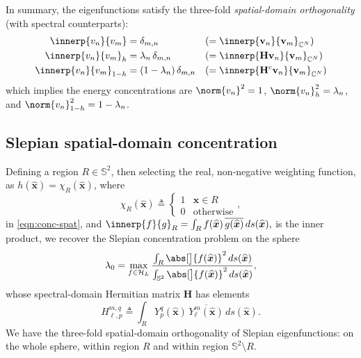 \documentclass[10pt, twocolumn, twoside]{IEEEtran}
\newcommand{\untsph}{\mathbb{S}^{2}} %
\newcommand{\unit}[1]{\widehat{\bm{#1}}}
\newcommand{\cmplx}{\mathbb{C}} %
\newcommand{\dfn}{\triangleq}
\newcommand{\conj}[1]{\overline{#1}} %
\begin{document}
In summary, the eigenfunctions satisfy the three-fold \emph{spatial-domain orthogonality} (with spectral counterparts):
\begin{align*}
	\innerp{v_n}{v_m}&=\delta_{m,n}
		&&(= \innerp{\mathbf{v}_n}{\mathbf{v}_m}_{\cmplx^N})\\
	\innerp{v_n}{v_m}_h&=\lambda_n\,\delta_{m,n}
		&&(=\innerp{\mathbf{H}\mathbf{v}_n}{\mathbf{v}_m}_{\cmplx^N})\\
	\innerp{v_n}{v_m}_{1-h}&=(1-\lambda_n)\,\delta_{m,n}
		&&(=\innerp{\mathbf{H}^{c}\mathbf{v}_n}{\mathbf{v}_m}_{\cmplx^N})
\end{align*}
which implies the energy concentrations are $\norm{v_n}^2=1$, $\norm{v_n}_h^2=\lambda_n$, and $\norm{v_n}_{1-h}^2=1-\lambda_n$.

\subsection{Slepian spatial-domain concentration}

Defining a region $R\in\untsph$, then selecting the real, non-negative weighting function, as $h(\unit{x})=\chi^{}_{R}(\unit{x})$, where
\begin{equation}
\label{eqn:indicator}
	\chi^{}_{R}(\unit{x}) \dfn
	\begin{cases}
		1 & \unit{x}\in R \\
		0 & \text{otherwise}
	\end{cases},
\end{equation}
in \eqref{eqn:conc-spat}, and
\(
	\innerp{f}{g}^{}_{R} 
		=\int_{R} f(\unit{x})\,\conj{g(\unit{x})}\,ds(\unit{x}),
\)
is the inner product, we recover the Slepian concentration problem on the sphere%
\begin{equation}
\label{eqn:conc-spat-slep}
	\lambda_0
		=\max_{f\in\mathcal{H}_{L}}\frac{\int_{R} \abs[\big]{f(\unit{x})}^2\,ds(\unit{x})}%
		{\int_{\untsph} \abs[\big]{f(\unit{x})}^2\,ds(\unit{x})},
\end{equation}
whose spectral-domain Hermitian matrix $\mathbf{H}$ has elements
\begin{equation}
\label{eqn:W-matrix-slep}
	H_{\ell,p}^{m,q} \dfn \int_{R} Y_{p}^{q}(\unit{x})\,
		\conj{Y_{\ell}^{m}(\unit{x})}\,ds(\unit{x}).
\end{equation}
We have the three-fold spatial-domain orthogonality of Slepian eigenfunctions: on the whole sphere, within region $R$ and within region $\untsph\setminus{}R$.
\end{document}
